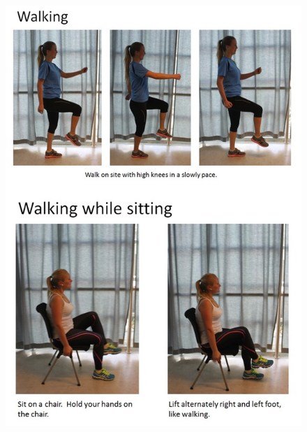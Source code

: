 \begin{figure} [ht!]
\centering
\includegraphics[scale=0.8]{Walking.jpg}
\label{walking}
\end{figure} 

